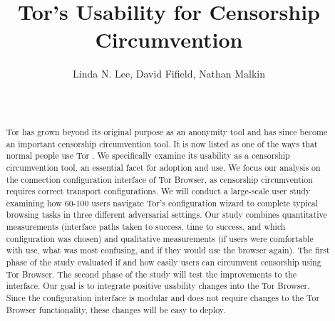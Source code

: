 \documentclass{template}
\begin{document}
\title{Tor's Usability for Censorship Circumvention}
\author{
 \alignauthor Linda N. Lee, David Fifield, Nathan Malkin \\
   \vspace{0.5em}
    \\
   \\
}
\maketitle

\begin{abstract}
Tor has grown beyond its original purpose as an anonymity tool and has 
since become an important censorship circumvention tool. It is now listed
as one of the ways that normal people use Tor \cite{whotor}.
We specifically examine its usability as a censorship circumvention tool,
an essential facet for adoption and use.  
We focus our analysis on the connection configuration interface of Tor Browser,
as censorship circumvention requires correct transport configurations.
We will conduct a large-scale user study examining how 60-100 users
navigate Tor's configuration wizard to complete typical browsing tasks
in three different adversarial settings. Our study combines quantitative measurements (interface
paths taken to success, time to success, and which configuration was chosen) and
qualitative measurements (if users were comfortable with use, what was most confusing, and 
if they would use the browser again). The first phase of the study evaluated if and how
easily users can circumvent censorship using Tor Browser. The second phase
of the study will test the improvements to the interface. 
Our goal is to integrate positive usability changes into the Tor Browser. Since
the configuration interface is modular and does not require changes to the Tor Browser
functionality, these changes will be easy to deploy. 

\end{abstract}

\end{document}
